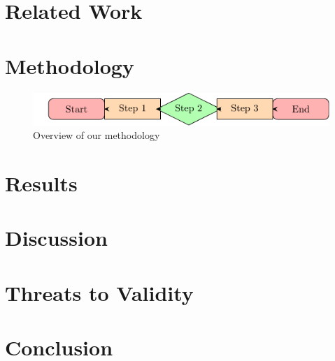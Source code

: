 \documentclass[sigconf,review,anonymous]{acmart}
\begin{document}
\section{Related Work}
\label{sec:related_work}

\section{Methodology}
\label{sec:methodology}

\begin{figure}
  \centering
  \includegraphics{figures/methodology}
  \caption{Overview of our methodology}
  \label{fig:approach}
\end{figure}

\section{Results}
\label{sec:results}


\section{Discussion}
\label{sec:discussion}

\section{Threats to Validity}
\label{sec:threats_to_validity}

\section{Conclusion}
\label{sec:conclusion}



\end{document}
